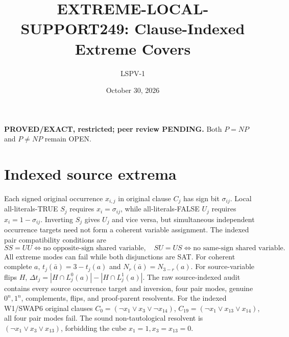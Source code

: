 \documentclass{article}
\title{EXTREME-LOCAL-SUPPORT249: Clause-Indexed Extreme Covers}
\author{LSPV-1}
\date{October 30, 2026}
\begin{document}
\maketitle
\noindent\textbf{PROVED/EXACT, restricted; peer review PENDING.}
Both $P=NP$ and $P\ne NP$ remain OPEN.
\section{Indexed source extrema}
Each signed original occurrence $x_{i,j}$ in original clause $C_j$ has sign bit $\sigma_{ij}$.
Local all-literals-TRUE $S_j$ requires $x_i=\sigma_{ij}$, while all-literals-FALSE $U_j$ requires $x_i=1-\sigma_{ij}$.
Inverting $S_j$ gives $U_j$ and vice versa, but simultaneous independent occurrence targets need not form a coherent variable assignment.
The indexed pair compatibility conditions are
\[
SS=UU\iff\text{no opposite-sign shared variable},\quad
SU=US\iff\text{no same-sign shared variable}.
\]
All extreme modes can fail while both disjunctions are SAT.
For coherent complete $a$, $t_j(\bar a)=3-t_j(a)$ and $N_r(\bar a)=N_{3-r}(a)$.
For source-variable flips $H$, $\Delta t_j=|H\cap L_j^0(a)|-|H\cap L_j^1(a)|$.
The raw source-indexed audit contains every source occurrence target and inversion, four pair modes, genuine $0^n,1^n$, complements, flips, and proof-parent resolvents.
For the indexed W1/SWAP6 original clauses $C_0=(\neg x_1\vee x_3\vee\neg x_{14})$, $C_{19}=(\neg x_1\vee x_{13}\vee x_{14})$, all four pair modes fail.
The sound non-tautological resolvent is $(\neg x_1\vee x_3\vee x_{13})$, forbidding the cube $x_1=1,x_3=x_{13}=0$.
\end{document}
